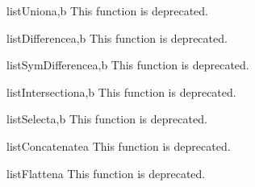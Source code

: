 \begin{funcdesc}{listUnion}{a,b}
This function is deprecated.
\end{funcdesc}

\begin{funcdesc}{listDifference}{a,b}
This function is deprecated.
\end{funcdesc}

\begin{funcdesc}{listSymDifference}{a,b}
This function is deprecated.
\end{funcdesc}

\begin{funcdesc}{listIntersection}{a,b}
This function is deprecated.
\end{funcdesc}

\begin{funcdesc}{listSelect}{a,b}
This function is deprecated.
\end{funcdesc}

\begin{funcdesc}{listConcatenate}{a}
This function is deprecated.
\end{funcdesc}

\begin{funcdesc}{listFlatten}{a}
This function is deprecated.
\end{funcdesc}


